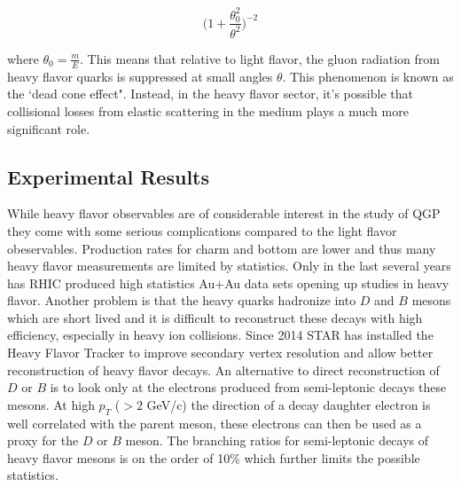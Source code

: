 \begin{equation}\label{eq:deadcone}
\Big( 1 + \frac{\theta^2_0}{\theta^2} \Big)^{-2}
\end{equation}

where $ \theta_0 = \frac{m}{E}$. This means that relative to light flavor, the gluon radiation from heavy flavor quarks is suppressed at small angles $\theta$. This phenomenon is known as the `dead cone effect". Instead, in the heavy flavor sector, it's possible that collisional losses from elastic scattering in the medium plays a much more significant role.

\subsection{Experimental Results}

While heavy flavor observables are of considerable interest in the study of QGP they come with some serious complications compared to the light flavor obeservables. Production rates for charm and bottom are lower and thus many heavy flavor measurements are limited by statistics. Only in the last several years has RHIC produced high statistics Au+Au data sets opening up studies in heavy flavor. Another problem is that the heavy quarks hadronize into $D$ and $B$ mesons which are short lived and it is difficult to reconstruct these decays with high efficiency, especially in heavy ion collisions. Since 2014 STAR has installed the Heavy Flavor Tracker to improve secondary vertex resolution and allow better reconstruction of heavy flavor decays. An alternative to direct reconstruction of $D$ or $B$ is to look only at the electrons produced from semi-leptonic decays these mesons. At high $p_T$ ($> 2$ GeV/c) the direction of a decay daughter electron is well correlated with the parent meson, these electrons can then be used as a proxy for the $D$ or $B$ meson. The branching ratios for semi-leptonic decays of heavy flavor mesons is on the order of 10\% which further limits the possible statistics.


